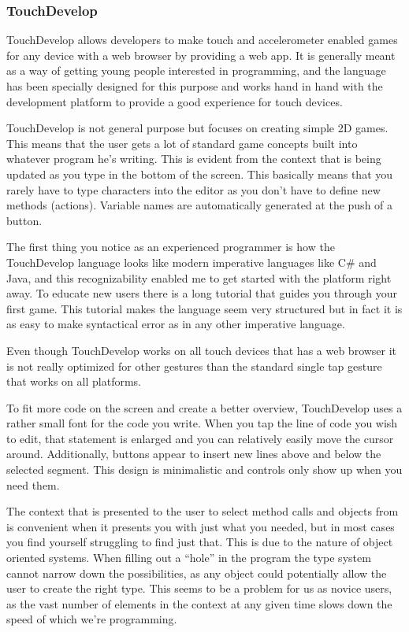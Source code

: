 \subsubsection{TouchDevelop}

TouchDevelop allows developers to make touch and accelerometer enabled games for any device with a web browser by providing a web app. It is generally meant as a way of getting young people interested in programming, and the language has been specially designed for this purpose and works hand in hand with the development platform to provide a good experience for touch devices.

TouchDevelop is not general purpose but focuses on creating simple 2D games. This means that the user gets a lot of standard game concepts built into whatever program he’s writing. This is evident from the context that is being updated as you type in the bottom of the screen. This basically means that you rarely have to type characters into the editor as you don’t have to define new methods (actions). Variable names are automatically generated at the push of a button.

The first thing you notice as an experienced programmer is how the TouchDevelop language looks like modern imperative languages like C\# and Java, and this recognizability enabled me to get started with the platform right away. To educate new users there is a long tutorial that guides you through your first game. This tutorial makes the language seem very structured but in fact it is as easy to make syntactical error as in any other imperative language.

Even though TouchDevelop works on all touch devices that has a web browser it is not really optimized for other gestures than the standard single tap gesture that works on all platforms.

To fit more code on the screen and create a better overview, TouchDevelop uses a rather small font for the code you write. When you tap the line of code you wish to edit, that statement is enlarged and you can relatively easily move the cursor around. Additionally, buttons appear to insert new lines above and below the selected segment. This design is minimalistic and controls only show up when you need them.

The context that is presented to the user to select method calls and objects from is convenient when it presents you with just what you needed, but in most cases you find yourself struggling to find just that. This is due to the nature of object oriented systems. When filling out a “hole” in the program the type system cannot narrow down the possibilities, as any object could potentially allow the user to create the right type. This seems to be a problem for us as novice users, as the vast number of elements in the context at any given time slows down the speed of which we’re programming.

